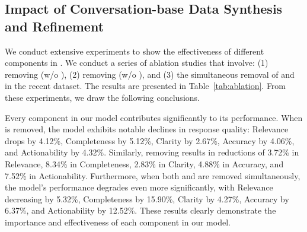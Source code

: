 \begin{table}[!t]
\caption{Performance of each component in \ourmodel on Recent dataset}
\label{tab:ablation}
\end{table}

\subsection{Impact of Conversation-base Data Synthesis and Refinement}
We conduct extensive experiments to show the effectiveness of different components in \ourmodel. We conduct a series of ablation studies that involve: (1) removing \convaugmentfull (w/o \convaugment), (2) removing \convrefinefull (w/o \convrefine), and (3) the simultaneous removal of \convaugment and \convrefine in the recent dataset. The results are presented in Table~\ref{tab:ablation}. From these experiments, we draw the following conclusions.

Every component in our model contributes significantly to its performance. When \convaugment is removed, the model exhibits notable declines in response quality: Relevance drops by 4.12\%, Completeness by 5.12\%, Clarity by 2.67\%, Accuracy by 4.06\%, and Actionability by 4.32\%. Similarly, removing \convrefine results in reductions of 3.72\% in Relevance, 8.34\% in Completeness, 2.83\% in Clarity, 4.88\% in Accuracy, and 7.52\% in Actionability. Furthermore, when both \convaugment and \convrefine are removed simultaneously, the model's performance degrades even more significantly, with Relevance decreasing by 5.32\%, Completeness by 15.90\%, Clarity by 4.27\%, Accuracy by 6.37\%, and Actionability by 12.52\%. These results clearly demonstrate the importance and effectiveness of each component in our model.

